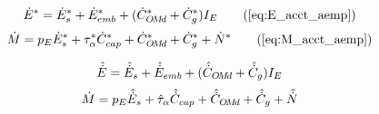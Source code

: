 


\begin{landscape}

\linespread{1}


\sectionsep{}

{
\begin{equation}
  \Eacctbsub{} \tag{\ref{eq:E_acct_aemp}}
\end{equation}
}
{
\begin{equation}
  \Macctbsub{} \tag{\ref{eq:M_acct_aemp}}
\end{equation}
}

\sectionsep{}


{
\begin{equation} \label{eq:E_acct_asub}
  \hat{\dot{E}} = \hat{\dot{E}}_s + \hat{\dot{E}}_{emb} + (\hat{\dot{C}}_{O\!M\!d} + \hat{\dot{C}}_g) I_E{}
\end{equation}
}
{
\begin{equation} \label{eq:M_acct_asub}
  \dot{M} = p_E \hat{\dot{E}}_s + \hat{\tau}_\alpha \hat{\dot{C}}_{cap} + \hat{\dot{C}}_{O\!M\!d} + \hat{\dot{C}}_g + \hat{\dot{N}}{}
\end{equation}
}

\sectionsep{}

\derivsection{}
{
~
  
}
\end{landscape}
